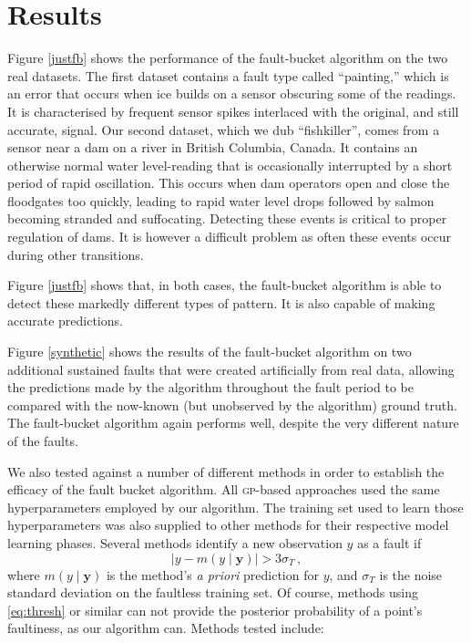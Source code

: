 \documentclass{article}
\newcommand{\given}{\ensuremath{\mid}}
\newcommand{\bm}[1]{\ensuremath{\mathbf{#1}}}
\newcommand{\acro}[1]{\textsc{#1}}
\newcommand{\vect}[1]{\bm{#1}}
\newcommand{\vy}{\vect{y}}
\newcommand{\mean}[2]{{m}(#1\given#2)}
\begin{document}

\section{Results}
Figure \ref{justfb} shows the performance of the fault-bucket
algorithm on the two real datasets.  The first dataset contains a
fault type called ``painting,'' which is an error that occurs when ice
builds on a sensor obscuring some of the readings. It is characterised
by frequent sensor spikes interlaced with the original, and still
accurate, signal.  Our second dataset, which we dub ``fishkiller'',
comes from a sensor near a dam on a river in British Columbia,
Canada. It contains an otherwise normal water level-reading that is
occasionally interrupted by a short period of rapid oscillation. This
occurs when dam operators open and close the floodgates too quickly,
leading to rapid water level drops followed by salmon becoming
stranded and suffocating. Detecting these events is critical to proper
regulation of dams. It is however a difficult problem as often these
events occur during other transitions.


Figure \ref{justfb} shows that, in both cases, the fault-bucket
algorithm is able to detect these markedly different types of
pattern. It is also capable of making accurate predictions.

Figure \ref{synthetic} shows the results of the fault-bucket algorithm
on two additional sustained faults that were created artificially from
real data, allowing the predictions made by the algorithm throughout
the fault period to be compared with the now-known (but unobserved by
the algorithm) ground truth.  The fault-bucket algorithm again
performs well, despite the very different nature of the faults.

We also tested against a number of different methods in order to establish the efficacy of the fault bucket algorithm. All \acro{gp}-based approaches used the same hyperparameters employed by our algorithm. The training set used to learn those hyperparameters was also supplied to other methods for their respective model learning phases. Several methods identify a new observation $y$ as a fault if
\begin{equation}
 \bigl\lvert y-\mean{y}{\vy} \bigr\rvert > 3\sigma_T\,,
 \label{eq:thresh}
\end{equation}
where $\mean{y}{\vy}$ is the method's \emph{a priori} prediction for $y$, and $\sigma_T$ is the noise standard deviation on the faultless training set. Of course, methods using \eqref{eq:thresh} or similar can not provide the posterior probability of a point's faultiness, as our algorithm can. Methods tested include:
\end{document}

